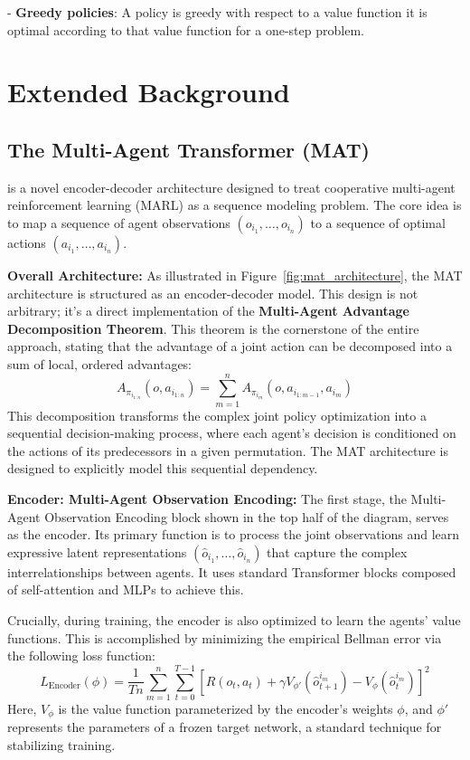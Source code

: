 - \textbf{Greedy policies}: A policy is greedy with respect to a value function it is optimal according to that value function for a one-step problem.



    
\newpage
\chapter{Extended Background}
\label{app:extended_background}
\section{The Multi-Agent Transformer (MAT)}
\label{sec:MAT}

 is a novel encoder-decoder architecture designed to treat cooperative multi-agent reinforcement learning (MARL) as a sequence modeling problem. The core idea is to map a sequence of agent observations $(o_{i_1}, \dots, o_{i_n})$ to a sequence of optimal actions $(a_{i_1}, \dots, a_{i_n})$.

\textbf{Overall Architecture: } As illustrated in  Figure~\ref{fig:mat_architecture}, the MAT architecture is structured as an encoder-decoder model. This design is not arbitrary; it's a direct implementation of the \textbf{Multi-Agent Advantage Decomposition Theorem}. This theorem is the cornerstone of the entire approach, stating that the advantage of a joint action can be decomposed into a sum of local, ordered advantages:
\begin{equation}
    \label{eq:mat_advantage_decomp}
    A_{\pi_{i_{1:n}}}(o, a_{i_{1:n}}) = \sum_{m=1}^{n} A_{\pi_{i_m}}(o, a_{i_{1:m-1}}, a_{i_m})
\end{equation}
This decomposition transforms the complex joint policy optimization into a sequential decision-making process, where each agent's decision is conditioned on the actions of its predecessors in a given permutation. The MAT architecture is designed to explicitly model this sequential dependency.

\textbf{Encoder: Multi-Agent Observation Encoding: } The first stage, the Multi-Agent Observation Encoding block shown in the top half of the diagram, serves as the encoder. Its primary function is to process the joint observations and learn expressive latent representations $(\hat{o}_{i_1}, \dots, \hat{o}_{i_n})$ that capture the complex interrelationships between agents. It uses standard Transformer blocks composed of self-attention and MLPs to achieve this.

Crucially, during training, the encoder is also optimized to learn the agents' value functions. This is accomplished by minimizing the empirical Bellman error via the following loss function:
\begin{equation}
    \label{eq:mat_encoder_loss}
    L_{\text{Encoder}}(\phi) = \frac{1}{Tn} \sum_{m=1}^{n} \sum_{t=0}^{T-1} \left[ R(o_t, a_t) + \gamma V_{\phi'}(\hat{o}_{t+1}^{i_m}) - V_{\phi}(\hat{o}_{t}^{i_m}) \right]^2
\end{equation}
Here, $V_{\phi}$ is the value function parameterized by the encoder's weights $\phi$, and $\phi'$ represents the parameters of a frozen target network, a standard technique for stabilizing training.

